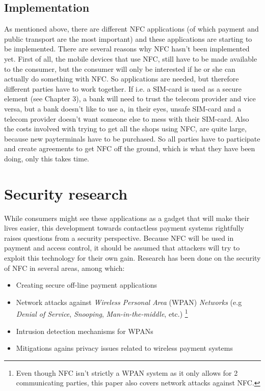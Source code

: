 \subsection{Implementation}
As mentioned above, there are different NFC applications (of which payment and public transport are the most important) and these applications are starting to be implemented. There are several reasons why NFC hasn't been implemented yet. First of all, the mobile devices that use NFC, still have to be made available to the consumer, but the consumer will only be interested if he or she can actually do something with NFC. So applications are needed, but therefore different parties have to work together. If i.e. a SIM-card is used as a secure element (see Chapter 3), a bank will need to trust the telecom provider and vice versa, but a bank doesn't like to use a, in their eyes, unsafe SIM-card and a telecom provider doesn't want someone else to mess with their SIM-card. Also the costs involved with trying to get all the shops using NFC, are quite large, because new payterminals have to be purchased.
So all parties have to participate and create agreements to get NFC off the ground, which is what they have been doing, only this takes time. %










\section{Security research}
While consumers might see these applications as a gadget that will make their lives easier, this development towards contactless payment systems rightfully raises questions from a security perspective.
Because NFC will be used in payment and access control, it should be assumed that attackers will try to exploit this technology for their own gain. 
Research has been done on the security of NFC in several areas, among which:

\begin{itemize}
\item Creating secure off-line payment applications \cite{1592613}
\item Network attacks against \textit{Wireless Personal Area} (WPAN) \textit{Networks} (e.g \textit{Denial of Service}, \textit{Snooping}, \textit{Man-in-the-middle}, etc.) \footnote{Even though NFC isn't strictly a WPAN system as it only allows for 2 communicating parties, this paper also covers network attacks against NFC.}  \cite{1506342}
\item Intrusion detection mechanisms for WPANs \cite{1361512}
\item Mitigations agains privacy issues related to wireless payment systems \cite{1527027}
\end{itemize}


